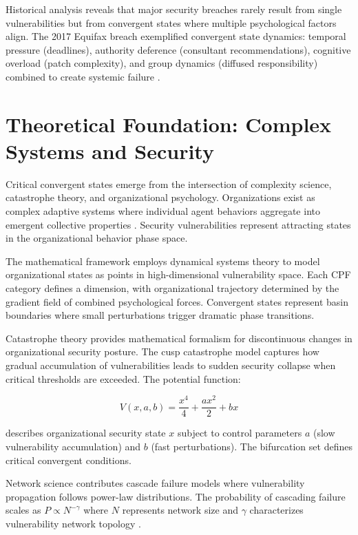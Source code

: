 \documentclass[11pt,a4paper]{article}
\begin{document}
Historical analysis reveals that major security breaches rarely result from single vulnerabilities but from convergent states where multiple psychological factors align. The 2017 Equifax breach exemplified convergent state dynamics: temporal pressure (deadlines), authority deference (consultant recommendations), cognitive overload (patch complexity), and group dynamics (diffused responsibility) combined to create systemic failure \cite{equifax2018}.

\section{Theoretical Foundation: Complex Systems and Security}

Critical convergent states emerge from the intersection of complexity science, catastrophe theory, and organizational psychology. Organizations exist as complex adaptive systems where individual agent behaviors aggregate into emergent collective properties \cite{miller2007}. Security vulnerabilities represent attracting states in the organizational behavior phase space.

The mathematical framework employs dynamical systems theory to model organizational states as points in high-dimensional vulnerability space. Each CPF category defines a dimension, with organizational trajectory determined by the gradient field of combined psychological forces. Convergent states represent basin boundaries where small perturbations trigger dramatic phase transitions.

Catastrophe theory provides mathematical formalism for discontinuous changes in organizational security posture. The cusp catastrophe model captures how gradual accumulation of vulnerabilities leads to sudden security collapse when critical thresholds are exceeded. The potential function:

\begin{equation}
V(x,a,b) = \frac{x^4}{4} + \frac{ax^2}{2} + bx
\end{equation}

describes organizational security state $x$ subject to control parameters $a$ (slow vulnerability accumulation) and $b$ (fast perturbations). The bifurcation set defines critical convergent conditions.

Network science contributes cascade failure models where vulnerability propagation follows power-law distributions. The probability of cascading failure scales as $P \propto N^{-\gamma}$ where $N$ represents network size and $\gamma$ characterizes vulnerability network topology \cite{watts2002}.
\end{document}
